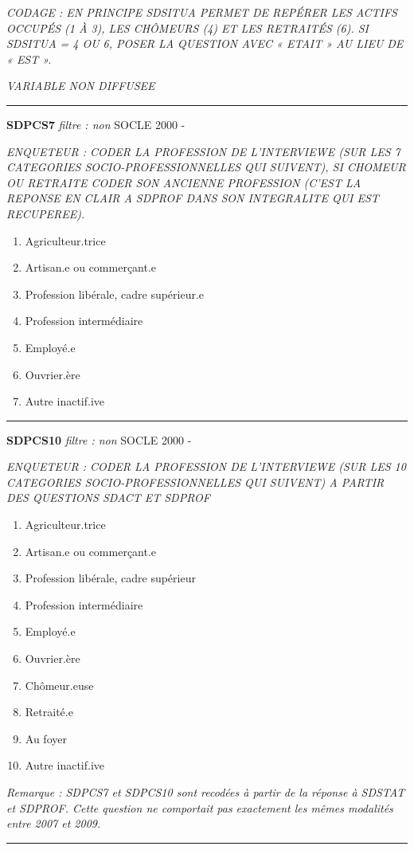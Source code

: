 \documentclass[12pt,a4paper]{reedthesis}
\providecommand{\tightlist}{%
  \setlength{\itemsep}{0pt}\setlength{\parskip}{0pt}}
\begin{document}
\emph{CODAGE : EN PRINCIPE SDSITUA PERMET DE REPÉRER LES ACTIFS OCCUPÉS (1 À 3), LES CHÔMEURS (4) ET LES RETRAITÉS (6). SI SDSITUA = 4 OU 6, POSER LA QUESTION AVEC « ETAIT » AU LIEU DE « EST ».}

\emph{VARIABLE NON DIFFUSEE}
\begin{center}\rule{0.5\linewidth}{0.5pt}\end{center}

\textbf{SDPCS7} \emph{filtre : non} SOCLE 2000 -

\emph{ENQUETEUR : CODER LA PROFESSION DE L'INTERVIEWE (SUR LES 7 CATEGORIES SOCIO-PROFESSIONNELLES QUI SUIVENT), SI CHOMEUR OU RETRAITE CODER SON ANCIENNE PROFESSION (C'EST LA REPONSE EN CLAIR A SDPROF DANS SON INTEGRALITE QUI EST RECUPEREE).}
\begin{enumerate}
\def\labelenumi{\arabic{enumi}.}
\tightlist
\item
  Agriculteur.trice
\item
  Artisan.e ou commerçant.e
\item
  Profession libérale, cadre supérieur.e
\item
  Profession intermédiaire
\item
  Employé.e
\item
  Ouvrier.ère
\item
  Autre inactif.ive
\end{enumerate}
\begin{center}\rule{0.5\linewidth}{0.5pt}\end{center}

\textbf{SDPCS10} \emph{filtre : non} SOCLE 2000 -

\emph{ENQUETEUR : CODER LA PROFESSION DE L'INTERVIEWE (SUR LES 10 CATEGORIES SOCIO-PROFESSIONNELLES QUI SUIVENT) A PARTIR DES QUESTIONS SDACT ET SDPROF}
\begin{enumerate}
\def\labelenumi{\arabic{enumi}.}
\tightlist
\item
  Agriculteur.trice
\item
  Artisan.e ou commerçant.e
\item
  Profession libérale, cadre supérieur
\item
  Profession intermédiaire
\item
  Employé.e
\item
  Ouvrier.ère\\
\item
  Chômeur.euse
\item
  Retraité.e
\item
  Au foyer
\item
  Autre inactif.ive
\end{enumerate}
\emph{Remarque : SDPCS7 et SDPCS10 sont recodées à partir de la réponse à SDSTAT et SDPROF. Cette question ne comportait pas exactement les mêmes modalités entre 2007 et 2009.}
\begin{center}\rule{0.5\linewidth}{0.5pt}\end{center}
\end{document}
